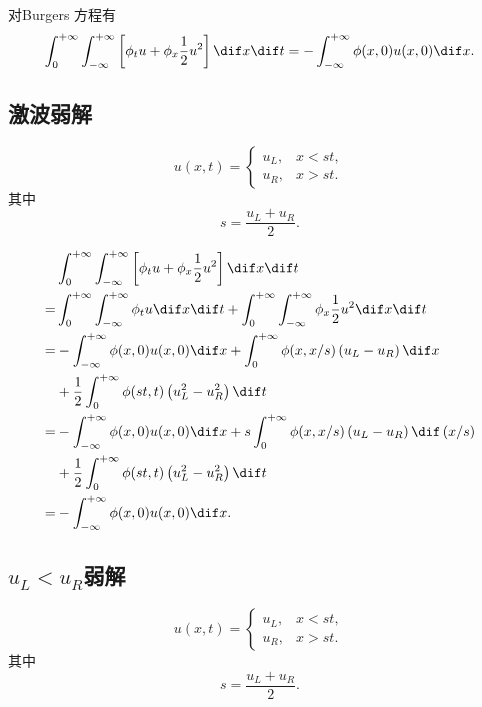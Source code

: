 \documentclass[12pt]{article}
\begin{document}
对Burgers 方程有
\begin{equation}
	\int_{0}^{+\infty} \int_{-\infty}^{+\infty}\left[\phi_{t} {u}+\phi_{x} \frac{1}{2}u^2\right] \dif x \dif t=-\int_{-\infty}^{+\infty} \phi(x, 0) {u}(x, 0) \dif x.
\end{equation}

\subsection{激波弱解}


\begin{equation}
	u(x, t)=
	\begin{cases}
		u_{L}, & x<s t, \\
		u_{R}, & x>s t	.
	\end{cases}
\end{equation}
其中
\begin{equation}
	s=\frac{u_L+u_R}{2}.
\end{equation}

\begin{align}
	& \int_{0}^{+\infty} \int_{-\infty}^{+\infty}\left[\phi_{t} {u}+\phi_{x} \frac{1}{2}u^2\right] \dif x \dif t \\
	= & \int_{0}^{+\infty} \int_{-\infty}^{+\infty}\phi_{t} {u} \dif x \dif t + \int_{0}^{+\infty} \int_{-\infty}^{+\infty}\phi_{x} \frac{1}{2}u^2 \dif x \dif t \\
	= & -\int_{-\infty}^{+\infty} \phi(x, 0) {u}(x, 0) \dif x +  \int_{0}^{+\infty} \phi(x, x/s) \left(u_L-u_R\right) \dif x\\
	& + \frac{1}{2} \int_{0}^{+\infty} \phi(st, t) \left(u_L^2-u_R^2\right) \dif t\\
	= & -\int_{-\infty}^{+\infty} \phi(x, 0) {u}(x, 0) \dif x +  s \int_{0}^{+\infty} \phi(x, x/s) \left(u_L-u_R\right) \dif\, (x/s)\\
	& + \frac{1}{2} \int_{0}^{+\infty} \phi(st, t) \left(u_L^2-u_R^2\right) \dif t\\
	= & -\int_{-\infty}^{+\infty} \phi(x, 0) {u}(x, 0) \dif x.
\end{align}

\subsection{$u_L<u_R$弱解}


\begin{equation}
	u(x, t)=
	\begin{cases}
		u_{L}, & x<s t, \\
		u_{R}, & x>s t	.
	\end{cases}
\end{equation}
其中
\begin{equation}
	s=\frac{u_L+u_R}{2}.
\end{equation}
\end{document}
